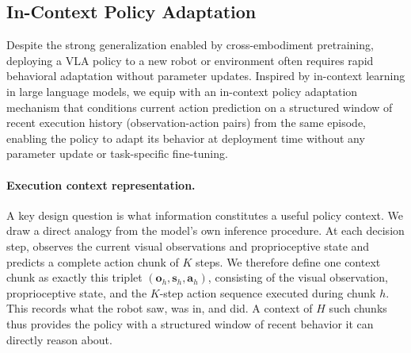 \subsection{In-Context Policy Adaptation}
\label{sec:in_context}

Despite the strong generalization enabled by cross-embodiment pretraining, deploying a VLA policy to a new robot or environment often requires rapid behavioral adaptation without parameter updates. Inspired by in-context learning in large language models, we equip \ours{} with an in-context policy adaptation mechanism that conditions current action prediction on a structured window of recent execution history (observation-action pairs) from the same episode, enabling the policy to adapt its behavior at deployment time without any parameter update or task-specific fine-tuning.

\paragraph{Execution context representation.}
A key design question is what information constitutes a useful policy context. We draw a direct analogy from the model's own inference procedure. At each decision step, \ours{} observes the current visual observations and proprioceptive state and predicts a complete action chunk of $K$ steps. We therefore define one context chunk as exactly this triplet $(\mathbf{o}_h, \mathbf{s}_h, \mathbf{a}_h)$, consisting of the visual observation, proprioceptive state, and the $K$-step action sequence executed during chunk $h$. This records what the robot saw, was in, and did. A context of $H$ such chunks thus provides the policy with a structured window of recent behavior it can directly reason about.

